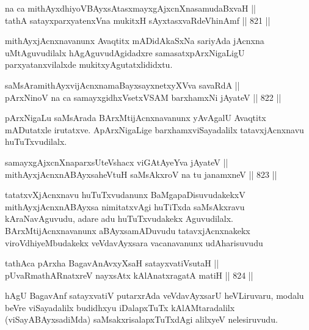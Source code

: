 
\begin{shl}
na ca mithAyxdhiyoV\s BAyxsAtasxmayxgAjxcnXnasamudaBxvaH || \\
tathA satayxparxyatenxVna mukitxH sAyxtasxvaRdeVhinAmf \hfill || 821 ||  
\end{shl}

\begin{artha}
mithAyxjAcnxnavanunx Avaqtitx mADidAkaSxNa sariyAda jAcnxna uMtAguvudilalx \-hAgAguvudAgidadxre samasatxpArxNigaLigU parxyatanxvilalxde mukitxyAgutatxlididxtu.
\end{artha}

\begin{shl}
saMsAramithAyxvijAcnxnamaBayxsayxnetxyXVva savaRdA || \\
pArxNinoV na ca samayxgidhxVsetxVSAM barxhamxNi jAyateV \hfill || 822 ||  
\end{shl}

\begin{artha}
pArxNigaLu saMsArada BArxMtijAcnxnavanunx yAvAgalU Avaqtitx mADutatxle irutatxve. ApArxNigaLige barxhamxviSayadalilx tatavxjAcnxnavu huTuTxvudilalx.
\end{artha}

\begin{shl}
samayxgAjxcnXnaparxsUteVshacx viGAtAyeYva jAyateV || \\
mithAyxjAcnxnABAyxsaheVtuH saMsAkxroV na tu janamxneV \hfill || 823 ||  
\end{shl}

\begin{artha}
tatatxvXjAcnxnavu huTuTxvudanunx BaMgapaDisuvudakekxV mithAyx\break jAcnxnABAyxsa nimitatxvAgi huTiTxda saMsAkxravu kAraNavAguvudu, adare adu huTuTxvudakekx Aguvudilalx. BArxMtijAcnxnavanunx aBAyxsamADuvudu tatavxjAcnxnakekx viroVdhiyeMbudakekx veVdavAyxsara vacanavanunx udAharisuvudu
\end{artha}

\begin{shl}
tathAca pArxha BagavAnAvxyXsaH satayxvatiVsutaH || \\
pUvaRmathARnatxreV nayxsAtx kAlAnatxragatA matiH \hfill || 824 ||  
\end{shl}

\begin{artha}
hAgU BagavAnf satayxvatiV putarxrAda veVdavAyxsarU heVLiruvaru, modalu beVre viSayadalilx budidhxyu iDalapxTuTx kAlAMtaradalilx (viSayABAyxsadiMda) saMsakxrisalapxTuTxdAgi alilxyeV nelesiruvudu.
\end{artha}

